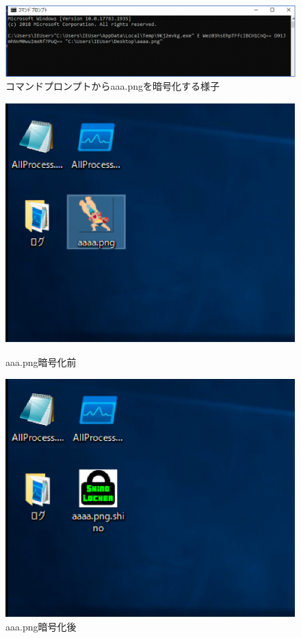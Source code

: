 \documentclass[dvipdfmx,autodetect-engine]{jsarticle}
\begin{document}
\begin{figure}[H]
  \centering
  \includegraphics[scale=0.6]{pic11.png}
  \caption{コマンドプロンプトからaaa.pngを暗号化する様子}
\end{figure}

\begin{figure}[h]
  \centering
  \begin{minipage}[b]{0.45\linewidth}
  \begin{center}
    \includegraphics[keepaspectratio,scale=0.7]{pic12.png}
    \end{center}
    \caption{aaa.png暗号化前}
  \end{minipage}
  \begin{minipage}[b]{0.45\linewidth}
  \begin{center}
    \includegraphics[keepaspectratio,scale=0.7]{pic13.png}
    \end{center}
    \caption{aaa.png暗号化後}
  \end{minipage}
\end{figure}
\end{document}

